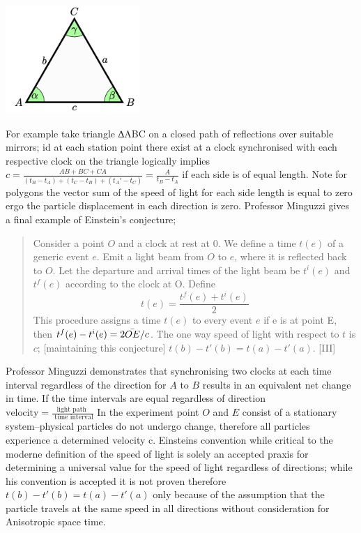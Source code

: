 \documentclass[12pt,letterpaper]{article}
\begin{document}
\begin{center}
    \includegraphics[width=2in]{Screenshot 2022-04-24 at 20.14.18.png}
\end{center}
For example take triangle ∆ABC on a closed path of reflections over suitable mirrors; id at each station point there exist at a clock synchronised with each respective clock on the triangle logically implies  $c=\frac {AB+BC+CA} {(t_B-t_A)+(t_C-t_B)+(t_A'-t_C)}=\frac {A}{t_B-t_A}$  if each side is of equal length. Note for polygons the vector sum of the speed of light for each side length is equal to zero ergo the particle displacement in each direction is zero. Professor Minguzzi gives a final example of Einstein's conjecture;
\begin{quote}
Consider a point $O$ and a clock at rest at 0. We define a time $t(e)$ of a generic event $e$. Emit a light beam from $O$ to $e$, where it is reflected back to $O$. Let the departure and arrival times of the light beam be $t^i(e)$ and $t^f(e)$ according to the clock at O. Define $$t(e) = \frac{t^f(e) + t^i(e)}{2}$$ This procedure assigns a time $t(e)$ to every event $e$ \…  if e is at point E, then $t^f(e)-t^i(e) =2\Bar{OE}/c $.  The one way speed of light with respect to $t$ is $c$; [maintaining this conjecture] $t(b) − t'(b) = t(a) − t'(a)$. [III]
\end{quote}
Professor Minguzzi demonstrates that synchronising two clocks at each time interval regardless of the direction for $A$ to $B$ results in an equivalent net change in time. If the time intervals are equal regardless of direction $\text {velocity}=\frac {\text{light path }} {\text { time interval}}$ In the experiment point $O$ and $E$ consist of a stationary system–physical particles do not undergo change, therefore all particles experience a determined velocity c. Einsteins convention while critical to the moderne definition of the speed of light is solely an accepted praxis for determining a universal value for the speed of light regardless of directions; while his convention is accepted it is not proven therefore $t(b)-t'(b) = t(a)-t'(a)$ only because of the assumption that the particle travels at the same speed in all directions without consideration for   Anisotropic space time.
\end{document}
